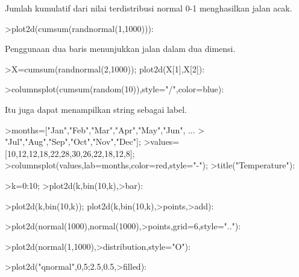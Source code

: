 \documentclass[a4paper,10pt]{article}
\begin{document}
\begin{eulernotebook}
\begin{eulercomment}
\begin{eulercomment}
\begin{eulercomment}
\begin{eulercomment}
\begin{eulercomment}
\begin{eulercomment}
\begin{eulercomment}
Jumlah kumulatif dari nilai terdistribusi normal 0-1 menghasilkan
jalan acak.
\end{eulercomment}
\begin{eulerprompt}
>plot2d(cumsum(randnormal(1,1000))):
\end{eulerprompt}
\begin{eulercomment}
Penggunaan dua baris menunjukkan jalan dalam dua dimensi.
\end{eulercomment}
\begin{eulerprompt}
>X=cumsum(randnormal(2,1000)); plot2d(X[1],X[2]):
\end{eulerprompt}
\begin{eulerprompt}
>columnsplot(cumsum(random(10)),style="/",color=blue):
\end{eulerprompt}
\begin{eulercomment}
Itu juga dapat menampilkan string sebagai label.
\end{eulercomment}
\begin{eulerprompt}
>months=["Jan","Feb","Mar","Apr","May","Jun", ...
>  "Jul","Aug","Sep","Oct","Nov","Dec"];
>values=[10,12,12,18,22,28,30,26,22,18,12,8];
>columnsplot(values,lab=months,color=red,style="-");
>title("Temperature"):
\end{eulerprompt}
\begin{eulerprompt}
>k=0:10;
>plot2d(k,bin(10,k),>bar):
\end{eulerprompt}
\begin{eulerprompt}
>plot2d(k,bin(10,k)); plot2d(k,bin(10,k),>points,>add):
\end{eulerprompt}
\begin{eulerprompt}
>plot2d(normal(1000),normal(1000),>points,grid=6,style=".."):
\end{eulerprompt}
\begin{eulerprompt}
>plot2d(normal(1,1000),>distribution,style="O"):
\end{eulerprompt}
\begin{eulerprompt}
>plot2d("qnormal",0,5;2.5,0.5,>filled):

\end{eulerprompt}
\end{eulercomment}
\end{eulercomment}
\end{eulercomment}
\end{eulercomment}
\end{eulercomment}
\end{eulercomment}
\end{eulernotebook}
\end{document}
